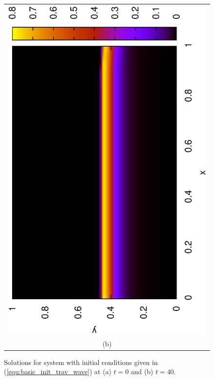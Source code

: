 \begin{figure}
\begin{tabular}{c}
      \includegraphics[scale = 0.5, angle = 270]{basic_trav_t40}\\
      (b) 
    \end{tabular}
    \caption{Solutions for system with initial conditions given in (\ref{equ:basic_init_trav_wave}) at (a) $t = 0$ and (b) $t = 40$.}
    \label{fig:basic_trav}
  \end{figure}

